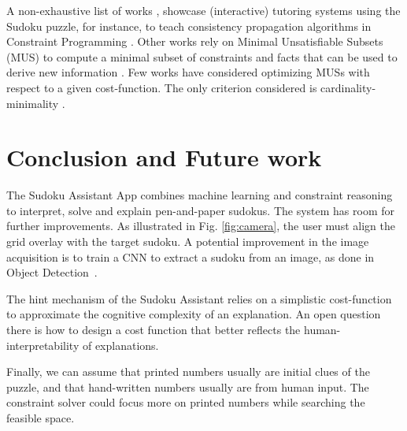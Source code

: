 \documentclass[letterpaper]{article} %
\begin{document}
A non-exhaustive list of works \cite{reeson2007interactive,caine2007tutoring}, showcase (interactive) tutoring systems using the Sudoku puzzle, for instance, to teach consistency propagation algorithms in Constraint Programming \cite{howell2018solving}. 
Other works rely on Minimal Unsatisfiable Subsets (MUS) to compute a minimal subset of constraints and facts that can be used to derive new information \cite{stepwiseExplaining,espasa2021using}. Few works have considered optimizing MUSs with respect to a given cost-function. The only criterion considered is cardinality-minimality \cite{conf/sat/LynceM04,ignatiev2015smallest}.

\section{Conclusion and Future work}

The Sudoku Assistant App combines machine learning and constraint reasoning to interpret, solve and explain pen-and-paper sudokus. 
The system has room for further improvements. As illustrated in Fig. \ref{fig:camera}, the user must align the grid overlay with the target sudoku. 
A potential improvement in the image acquisition is to train a CNN to extract a sudoku from an image, as done in Object Detection~\cite{TableNet}. 

The hint mechanism of the Sudoku Assistant relies on a simplistic cost-function to approximate the cognitive complexity of an explanation.
An open question there is how to design a cost function that better reflects the human-interpretability of explanations. 

Finally, we can assume that printed numbers usually are initial clues of the puzzle, and that hand-written numbers usually are  from human input. The constraint solver could focus more on printed numbers while searching the feasible space. 

% 
%
\end{document}
